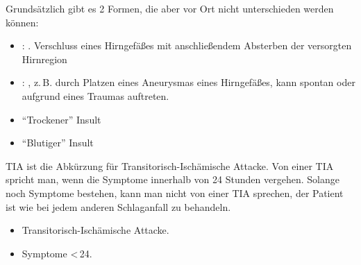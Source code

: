 {%
Grundsätzlich gibt es 2 Formen, die aber vor Ort nicht
unterschieden werden können:
\begin{itemize}
  \item {}:
  . Verschluss eines
  Hirngefäßes mit anschließendem Absterben der versorgten Hirnregion
  \item {}: , z.\,B.
  durch Platzen eines Aneurysmas eines Hirngefäßes, kann spontan
  oder aufgrund eines Traumas auftreten.
\end{itemize}

}
{
\begin{itemize}
  \item \enquote{Trockener} Insult
  \item \enquote{Blutiger} Insult
\end{itemize}

}{}{}{}

{%
\label{topic:tia}
TIA ist die Abkürzung für Transitorisch-Ischämische Attacke.
Von einer TIA spricht man, wenn die Symptome  innerhalb von
24 Stunden vergehen. Solange noch Symptome bestehen, kann
man nicht von einer TIA sprechen, der Patient ist wie bei
jedem anderen Schlaganfall zu behandeln.
\bigskip
}
{
\begin{itemize}
  \item Transitorisch-Ischämische Attacke.
  \item Symptome <\,24\Hour*.
\end{itemize}

}{}{}{}



